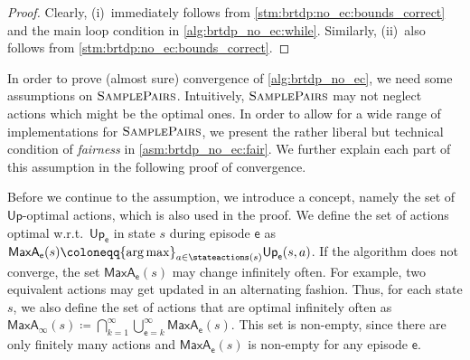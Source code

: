 \documentclass{article}
\newcommand{\UnionSym}{\bigcup}
\newcommand{\IntersectionSym}{\bigcap}
\newcommand{\Union}{\UnionSym}
\newcommand{\Intersection}{\IntersectionSym}
\DeclareMathOperator*{\argmax}{arg\,max}
\newcommand{\upperbound}{\mathsf{Up}}
\newcommand{\samplepath}{\textsc{SamplePairs}}
\newcommand{\algoepisode}{\mathsf{e}}
\newcommand{\umaxactions}{\mathsf{MaxA}}
\begin{document}
\begin{proof}
	Clearly, (i)~immediately follows from \cref{stm:brtdp:no_ec:bounds_correct} and the main loop condition in \cref{alg:brtdp_no_ec:while}.
	Similarly, (ii)~also follows from \cref{stm:brtdp:no_ec:bounds_correct}. 
\end{proof}
In order to prove (almost sure) convergence of \cref{alg:brtdp_no_ec}, we need some assumptions on $\samplepath$.
Intuitively, $\samplepath$ may not neglect actions which might be the optimal ones.
In order to allow for a wide range of implementations for $\samplepath$, we present the rather liberal but technical condition of \emph{fairness} in \cref{asm:brtdp_no_ec:fair}.
We further explain each part of this assumption in the following proof of convergence.

Before we continue to the assumption, we introduce a concept, namely the set of $\upperbound$-optimal actions, which is also used in the proof.
We define the set of actions optimal w.r.t.\ $\upperbound_\algoepisode$ in state $s$ during episode $\algoepisode$ as $\umaxactions_\algoepisode(s) \coloneqq {\argmax}_{a \in \stateactions(s)} \upperbound_\algoepisode(s, a)$.
If the algorithm does not converge, the set $ \umaxactions_{\algoepisode}(s)$ may change infinitely often.
For example, two equivalent actions may get updated in an alternating fashion.
Thus, for each state $s$, we also define the set of actions that are optimal infinitely often as $\umaxactions_\infty(s) \coloneqq {\Intersection}_{k = 1}^\infty {\Union}_{\algoepisode = k}^\infty \umaxactions_{\algoepisode}(s)$.
This set is non-empty, since there are only finitely many actions and $\umaxactions_\algoepisode(s)$ is non-empty for any episode $\algoepisode$.
\end{document}

